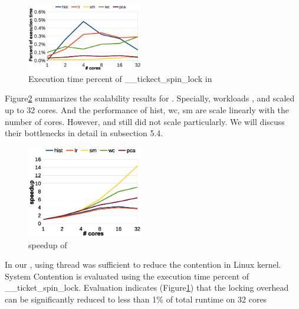 \begin{figure}[!h!t]  
	\centering
	\includegraphics[width=0.45\textwidth]{eps/dmr_spinlock.eps}
	\caption{Execution time percent of \_\_tickect\_spin\_lock in \myds}
	\label{fig:smr:spinlock}
\end{figure}

Figure\ref{fig:smr:speedup} summarizes the scalability results for \myds.
Specially, workloads ,  and  scaled up to 32 cores.
And the performance of hist, wc, sm are scale linearly with the number of cores.
However,  and  still did not scale particularly. 
We will discuss their bottlenecks in detail in subsection 5.4.
\begin{figure}[!h!t]  
	\centering
	\includegraphics[width=0.45\textwidth]{eps/dmr_speedup.eps}
	\caption{speedup of \myds}
	\label{fig:smr:speedup}
\end{figure}

In our \myds, using \myth thread was sufficient to reduce the contention in Linux kernel. 
System Contention is evaluated using the execution time percent of \_\_ticket\_spin\_lock. 
Evaluation indicates (Figure\ref{fig:smr:spinlock}) that the locking overhead can be significantly reduced to less than 1\% of total runtime on 32 cores


